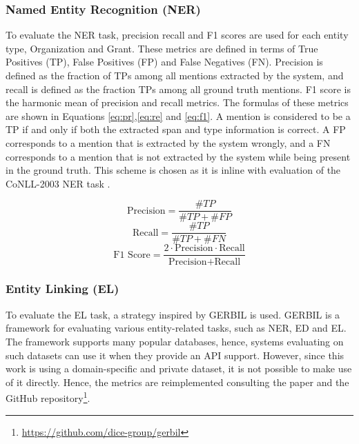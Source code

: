 \documentclass{report}
\theoremstyle{definition}
\theoremstyle{remark}
\begin{document}
\subsubsection{Named Entity Recognition (NER)}
To evaluate the NER task, precision recall and F1 scores are used for each entity type, Organization and Grant. These metrics are defined in terms of True Positives (TP), False Positives (FP) and False Negatives (FN). Precision is defined as the fraction of TPs among all mentions extracted by the system, and recall is defined as the fraction TPs among all ground truth mentions. F1 score is the harmonic mean of precision and recall metrics. The formulas of these metrics are shown in Equations \ref{eq:pr},\ref{eq:re} and \ref{eq:f1}. A mention is considered to be a TP if and only if both the extracted span and type information is correct. A FP corresponds to a mention that is extracted by the system wrongly, and a FN corresponds to a mention that is not extracted by the system while being present in the ground truth. This scheme is chosen as it is inline with evaluation of the CoNLL-2003 NER task \cite{conll}.

\begin{equation}
\label{eq:pr}
    \text{Precision} = \frac{\#TP}{\#TP+\#FP} 
\end{equation}
\begin{equation}
\label{eq:re}
    \text{Recall} = \frac{\#TP}{\#TP+\#FN} 
\end{equation}
\begin{equation}
\label{eq:f1}
    \text{F1 Score} = \frac{2\cdot\text{Precision}\cdot\text{Recall}}{\text{Precision}+\text{Recall}} 
\end{equation}

\subsubsection{Entity Linking (EL)}
To evaluate the EL task, a strategy inspired by GERBIL \cite{gerbil} is used. GERBIL is a framework for evaluating various entity-related tasks, such as NER, ED and EL. The framework supports many popular databases, hence, systems evaluating on such datasets can use it when they provide an API support. However, since this work is using a domain-specific and private dataset, it is not possible to make use of it directly. Hence, the metrics are reimplemented consulting the paper \cite{gerbil} and the GitHub repository\footnote{\url{https://github.com/dice-group/gerbil}}. 
\end{document}
